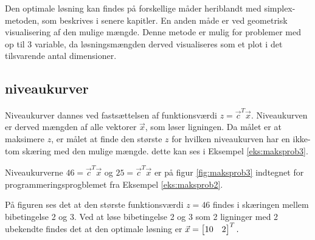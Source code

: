 Den optimale løsning kan findes på forskellige måder heriblandt med simplex-metoden, som beskrives i senere kapitler. En anden måde er ved geometrisk visualisering af den mulige mængde. Denne metode er mulig for problemer med op til 3 variable, da løsningsmængden derved visualiseres som et plot i det tilsvarende antal dimensioner. 

\subsection{niveaukurver}
Niveaukurver dannes ved fastsættelsen af funktionsværdi $z=\vec{c}^T \vec{x}$. Niveaukurven er derved mængden af alle vektorer $\vec{x}$, som løser ligningen. Da målet er at maksimere $z$, er målet at finde den største $z$ for hvilken niveaukurven har en ikke-tom skæring med den mulige mængde. dette kan ses i Eksempel \ref{eks:maksprob3}.
\begin{comment}
Bør niveaukurve defineres????? Hvordan kan dette bruges for finde $z$ er egentlig bare en omskrivning, så der mangler noget argumentation for at $z$ bliver større jo længere væk fra origo man er, hvilket giver ret god mening, men er svært at argumentere for uden at starte på geometri, så måske hele dette afsnit skulle flyttes, måske skal alt om løsninger skal flyttes til geometri?
\end{comment}


\begin{eks}
Niveaukurverne $46=\vec{c}^T \vec{x}$ og $25=\vec{c}^T \vec{x}$ er på figur \ref{fig:maksprob3} indtegnet for programmeringsprogblemet fra Eksempel \ref{eks:maksprob2}.

	\begin{center}	
		
		\label{fig:maksprob3} %
	\end{center}
	
På figuren ses det at den største funktionsværdi $z=46$ findes i skæringen mellem bibetingelse 2 og 3.
Ved at løse bibetingelse 2 og 3 som 2 ligninger med 2 ubekendte findes det at den optimale løsning er $\vec{x}=\begin{bmatrix} 10 & 2 \end{bmatrix}^T.$
\label{eks:maksprob3}
\end{eks}


\begin{comment}
Stadig to do i afsnittet\\
- Hvis der findes en løsning, findes der en optimal løsning (med evt. bevis. burde ikke være så svært med modstrid)\\

Skal jeg have det med at løsninger findes i hjørner? det virker til at kræve en smule mere geometri og hører nok bedre til i geometri afsnittet. %

\end{comment}
